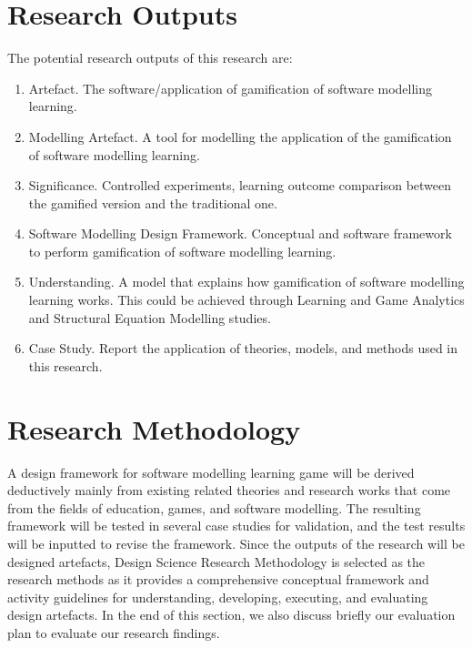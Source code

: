 \documentclass[12pt, a4paper]{report}
\begin{document}
{\section{Research Outputs}
The potential research outputs of this research are:
\begin{enumerate}
\item Artefact. The software/application of gamification of software modelling learning.
\item Modelling Artefact. A tool for modelling the application of the gamification of software modelling learning.
\item Significance. Controlled experiments, learning outcome comparison between the gamified version and the traditional one.
\item Software Modelling Design Framework. Conceptual and software framework to perform gamification of software modelling learning.
\item Understanding. A model that explains how gamification of software modelling learning works.
This could be achieved through Learning and Game Analytics and Structural Equation Modelling studies.
\item Case Study. Report the application of theories, models, and methods used in this research.
\end{enumerate}

\section{Research Methodology}
A design framework for software modelling learning game will be derived deductively mainly from existing related theories and research works that come from the fields of education, games, and software modelling. The resulting framework will be tested in several case studies for validation, and the test results will be inputted to revise the framework. Since the outputs of the research will be designed artefacts, Design Science Research Methodology \cite{peffers2007design} is selected as the research methods as it provides a comprehensive conceptual framework and activity guidelines for understanding, developing, executing, and evaluating design artefacts. In the end of this section, we also discuss  briefly our evaluation plan to evaluate our research findings.  

}
\end{document}
